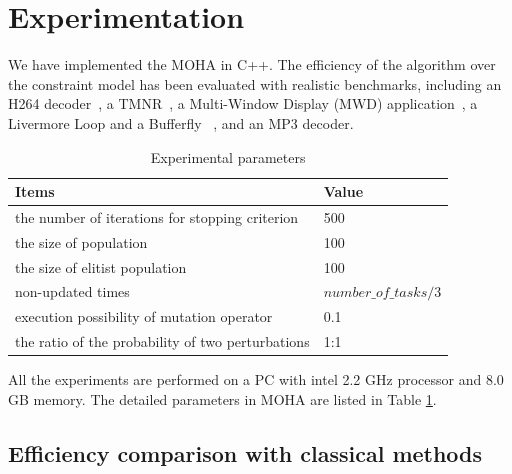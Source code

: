 \section{Experimentation\label{se:imp}}
We have implemented the MOHA in C++. %
The efficiency of the algorithm over the constraint model has been evaluated with realistic benchmarks, including an H264 decoder~\cite{IEICE14}, a TMNR~\cite{cotton2011multi}, a Multi-Window Display (MWD) application~\cite{atienza2008},  a Livermore Loop and a Bufferfly ~\cite{kessler2009optimized}, and an MP3 decoder. %

\begin{table}[htp]\centering
\caption{Experimental parameters \label{tab:setting}}
\begin{lrbox}{\tablebox}
\begin{tabular}{l l }
\hline
	Items & Value \\
\hline
the number of iterations for stopping criterion & 500  \\
the size of population  &100 \\
the size of elitist population & 100 \\
non-updated times & $number\_of\_tasks/3 $\\
execution possibility of mutation operator & 0.1 \\
the ratio of the probability of two perturbations	& 1:1 \\
\hline
\end{tabular}	
\end{lrbox}
\scalebox{0.8}{\usebox{\tablebox}}
\end{table}

All the experiments are performed on a PC with intel 2.2 GHz processor and 8.0 GB memory. The detailed parameters in MOHA are listed in Table \ref{tab:setting}. 


\subsection{Efficiency comparison with classical methods}

